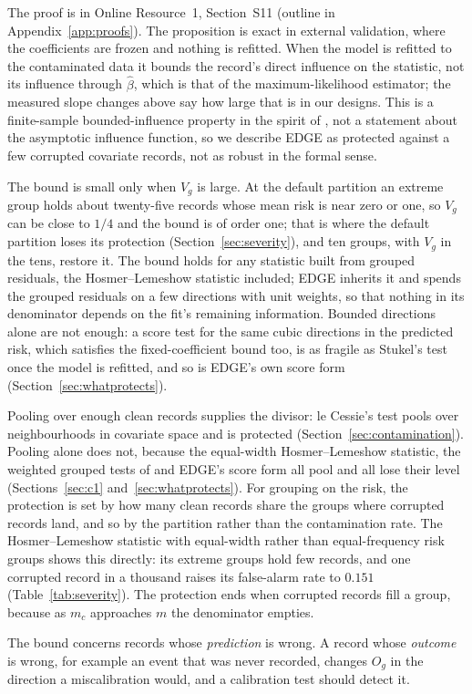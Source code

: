 The proof is in Online Resource~1, Section~S11 (outline in Appendix~\ref{app:proofs}). The proposition is exact in external validation, where
the coefficients are frozen and nothing is refitted. When the model is refitted to the contaminated
data it bounds the record's direct influence on the statistic, not its influence through
$\hat\beta$, which is that of the maximum-likelihood estimator; the measured slope changes above say
how large that is in our designs. This is a finite-sample bounded-influence property in the spirit of
\citet{hampel1986robust}, not a statement about the asymptotic influence function, so we describe EDGE
as protected against a few corrupted covariate records, not as robust in the formal sense.

The bound is small only when $V_g$ is large. At the default partition an extreme group holds about
twenty-five records whose mean risk is near zero or one, so $V_g$ can be close to $1/4$ and the bound is of
order one; that is where the default partition loses its protection (Section~\ref{sec:severity}), and
ten groups, with $V_g$ in the tens, restore it. The bound holds for any statistic built from grouped
residuals, the Hosmer--Lemeshow statistic included; EDGE inherits it and spends the grouped residuals on
a few directions with unit weights, so that nothing in its denominator depends on the fit's remaining
information. Bounded directions alone are not enough: a score test for the same cubic directions in
the predicted risk, which satisfies the fixed-coefficient bound too, is as fragile as Stukel's test
once the model is refitted, and so is EDGE's own score form (Section~\ref{sec:whatprotects}).

Pooling over enough clean records supplies the divisor: le Cessie's test pools over neighbourhoods in
covariate space and is protected (Section~\ref{sec:contamination}). Pooling alone does not, because
the equal-width Hosmer--Lemeshow statistic, the weighted grouped tests of \citet{hosmer2002goodness}
and EDGE's score form all pool and all lose their level (Sections~\ref{sec:c1}
and~\ref{sec:whatprotects}). For grouping on the risk, the protection is
set by how many clean records share the groups where corrupted records land, and so by the
partition rather than the contamination rate. The Hosmer--Lemeshow statistic with equal-width rather
than equal-frequency risk groups shows this directly: its extreme groups hold few records, and one
corrupted record in a thousand raises its false-alarm rate to $0.151$ (Table~\ref{tab:severity}). The
protection ends when corrupted records fill a group, because as $m_c$ approaches $m$ the denominator
empties.

The bound concerns records whose \emph{prediction} is wrong. A record whose \emph{outcome} is wrong,
for example an event that was never recorded, changes $O_g$ in the direction a miscalibration would,
and a calibration test should detect it.
